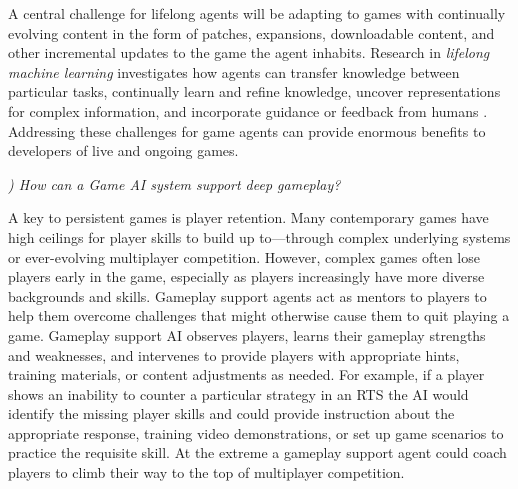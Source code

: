 \documentclass[conference]{IEEEtran}
\newcounter{questionno}
\newcommand{\subsubsectionx}[1]{{\em {\arabic{questionno}) #1}}
	\addtocounter{questionno}{1}
	}
\begin{document}

A central challenge for lifelong agents will be adapting to games with continually evolving content
in the form of  
patches, expansions, downloadable content, and other incremental updates to the game the agent inhabits.
Research in {\em lifelong machine learning} investigates how agents can transfer knowledge between particular tasks, continually learn and refine knowledge, uncover representations for complex information, and incorporate guidance or feedback from humans \cite{silver2013:lifelong-ml}.
Addressing these challenges for game agents can provide enormous benefits to developers of live and ongoing games.


\subsubsectionx{How can a Game AI system support deep gameplay?}
%
A key to persistent games is player retention.
Many contemporary games have high ceilings for player skills to build up to---through complex underlying systems or ever-evolving multiplayer competition. 
However, complex games often lose players early in the game, especially as players increasingly have more diverse backgrounds and skills.
Gameplay support agents act as mentors to players to help them overcome challenges that might otherwise cause them to quit playing a game. 
Gameplay support AI observes players, learns their gameplay strengths and weaknesses, and intervenes to provide players with appropriate hints, training materials, or content adjustments as needed. 
For example, if a player shows an inability to counter a particular strategy in an RTS the AI would identify the missing player skills and could provide instruction about the appropriate response, training video demonstrations, or set up game scenarios to practice the requisite skill. 
At the extreme a gameplay support agent could coach players to climb their way to the top of multiplayer competition.
\end{document}
